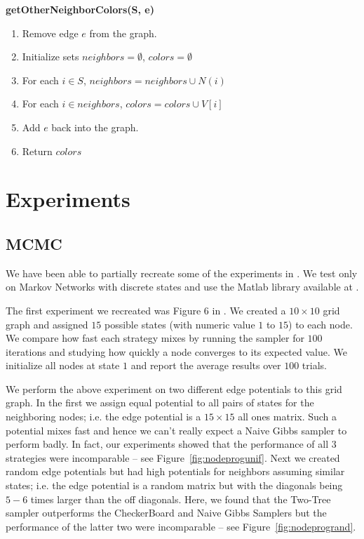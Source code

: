\documentclass{article} %
\begin{document}
\begin{framed}
\noindent\textbf{getOtherNeighborColors(S, e)}
\begin{enumerate}
\item Remove edge $e$ from the graph.
\item Initialize sets $neighbors=\emptyset$, $colors=\emptyset$
\item For each $i\in S$, $neighbors=neighbors\cup N(i)$
\item For each $i\in neighbors$, $colors=colors\cup V[i]$
\item Add $e$ back into the graph.
\item Return $colors$
\end{enumerate}
\end{framed}



\section{Experiments}

\subsection{MCMC}%

We have been able to
partially recreate some of the experiments in \cite{hamze2004fields}. We
test only on Markov Networks with discrete states and use the Matlab library
available at \cite{schmidt07ugm}.

The first experiment we recreated was Figure 6 in \cite{hamze2004fields}. We
created a $10 \times 10$ grid graph and assigned $15$ possible states (with
numeric value $1$ to $15$) to each node. We compare how fast each strategy mixes
by running the sampler for $100$ iterations and studying how quickly a node
converges to its expected value. We initialize all nodes at state $1$ and report
the average results over $100$ trials.

We perform the above experiment on two different edge potentials to this grid
graph. In the first we assign equal potential to all pairs of
states for the neighboring nodes; i.e. the edge potential is a $15 \times 15$
all ones matrix. Such a potential mixes fast and hence we can't really expect a
Naive Gibbs sampler to perform badly. In fact, our experiments showed that the
performance of all $3$ strategies were incomparable -- see
Figure~\ref{fig:nodeprogunif}. Next we created random edge potentials but had
high potentials for neighbors assuming similar states; i.e. the edge potential
is a random matrix but with the diagonals being $5-6$ times larger than the off
diagonals. Here, we found that the Two-Tree sampler outperforms the CheckerBoard
and Naive Gibbs Samplers but the performance of the latter two were
incomparable -- see Figure~\ref{fig:nodeprogrand}.
\end{document}
